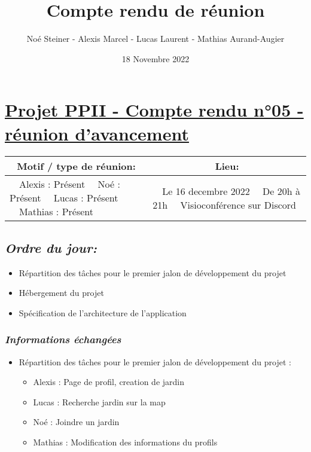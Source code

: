 \documentclass[french,a4paper]{article}
\author{Noé Steiner - Alexis Marcel - Lucas Laurent - Mathias Aurand-Augier}
\date{18 Novembre 2022}
\newcommand{\tabitem}{\textbullet~~}\title{Compte rendu de réunion}
\begin{document}
\maketitle

\section*{\underline{Projet PPII - Compte rendu n°05 - réunion d'avancement}}

\begin{table}[!htb]
  \centering
  \begin{tabular}{| p{7cm} | p{7cm} |}
    \hline
    \multicolumn{1}{|c|}{ Motif / type de réunion:} & \multicolumn{1}{c|}{Lieu:} \\
    \hline
    \tabitem Alexis : Présent\newline
    \tabitem Noé : Présent\newline
    \tabitem Lucas : Présent\newline
    \tabitem Mathias : Présent                      &
    \tabitem Le 16 decembre 2022\newline
    \tabitem De 20h à 21h\newline
    \tabitem Visioconférence sur Discord                                         \\
    \hline
  \end{tabular}
\end{table}

\subsection*{\textit{Ordre du jour:}}

\begin{itemize}
  \item Répartition des tâches pour le premier jalon de développement du projet
  \item Hébergement du projet
  \item Spécification de l'architecture de l'application
\end{itemize}

\subsubsection*{\textit{Informations échangées}}
\begin{itemize}
  \item Répartition des tâches pour le premier jalon de développement du projet :
    \begin{itemize}
      \item Alexis : Page de profil, creation de jardin
      \item Lucas : Recherche jardin sur la map
      \item Noé : Joindre un jardin
      \item Mathias : Modification des informations du profils
    \end{itemize}
\end{itemize}
\end{document}
